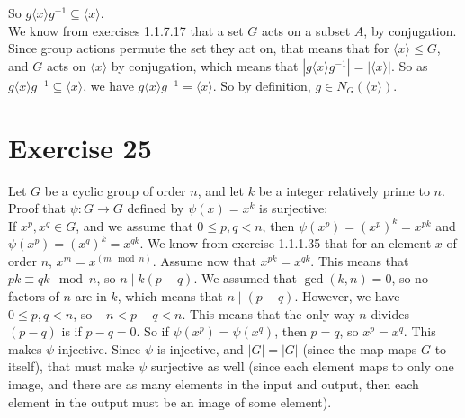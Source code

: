 \documentclass{article}
\begin{document}
\begin{enumerate}[label=\textbf{\alph*.}]
            So $g\langle x \rangle g^{-1} \subseteq \langle x \rangle$. \\
            We know from exercises 1.1.7.17
            that a set $G$ acts on a subset $A$,
            by conjugation.
            Since group actions permute the set they act on,
            that means that for $\langle x \rangle \leqslant G$,
            and $G$ acts on $\langle x \rangle$ by conjugation,
            which means that
            $|g\langle x \rangle g^{-1}| = |\langle x \rangle|$.
            So as $g\langle x \rangle g^{-1} \subseteq \langle x \rangle$,
            we have $g\langle x \rangle g^{-1} = \langle x \rangle$.
            So by definition, $g \in N_G(\langle x \rangle)$.
    \end{enumerate}


    \section*{Exercise 25}
    Let $G$ be a cyclic group of order $n$,
    and let $k$ be a integer relatively prime to $n$.
    Proof that $\psi: G \to G$ defined by $\psi(x) = x^k$ is surjective: \\
    If $x^p, x^q \in G$,
    and we assume that $0 \leqslant p, q < n$,
    then $\psi(x^p) = (x^p)^k = x^{pk}$
    and $\psi(x^p) = (x^q)^k = x^{qk}$.
    We know from exercise 1.1.1.35 that for an element $x$ of order $n$,
    $x^m = x^{(m \mod n)}$.
    Assume now that $x^{pk} = x^{qk}$.
    This means that $pk \equiv qk \mod n$,
    so $n \mid k(p - q)$.
    We assumed that $\gcd(k, n) = 0$,
    so no factors of $n$ are in $k$,
    which means that $n \mid (p - q)$.
    However, we have $0 \leqslant p, q < n$, 
    so $-n < p - q < n$.
    This means that the only way $n$ divides $(p - q)$
    is if $p - q = 0$.
    So if $\psi(x^p) = \psi(x^q)$,
    then $p = q$, 
    so $x^p = x^q$.
    This makes $\psi$ injective.
    Since $\psi$ is injective,
    and $|G| = |G|$ (since the map maps $G$ to itself),
    that must make $\psi$ surjective as well
    (since each element maps to only one image,
    and there are as many elements in the input and output,
    then each element in the output must be an image of some element).
\end{document}
